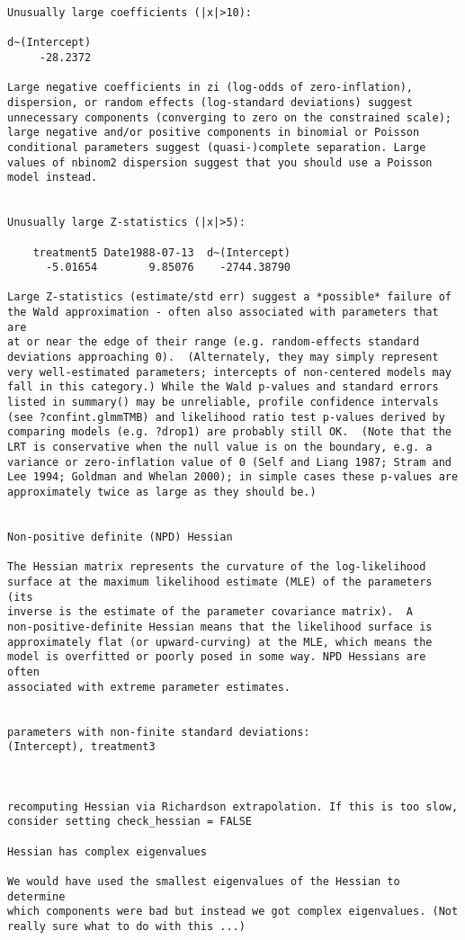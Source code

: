 \documentclass[
  letterpaper,
  DIV=11,
  numbers=noendperiod]{scrreprt}
\begin{document}
\begin{verbatim}
Unusually large coefficients (|x|>10):

d~(Intercept) 
     -28.2372 

Large negative coefficients in zi (log-odds of zero-inflation),
dispersion, or random effects (log-standard deviations) suggest
unnecessary components (converging to zero on the constrained scale);
large negative and/or positive components in binomial or Poisson
conditional parameters suggest (quasi-)complete separation. Large
values of nbinom2 dispersion suggest that you should use a Poisson
model instead.


Unusually large Z-statistics (|x|>5):

    treatment5 Date1988-07-13  d~(Intercept) 
      -5.01654        9.85076    -2744.38790 

Large Z-statistics (estimate/std err) suggest a *possible* failure of
the Wald approximation - often also associated with parameters that are
at or near the edge of their range (e.g. random-effects standard
deviations approaching 0).  (Alternately, they may simply represent
very well-estimated parameters; intercepts of non-centered models may
fall in this category.) While the Wald p-values and standard errors
listed in summary() may be unreliable, profile confidence intervals
(see ?confint.glmmTMB) and likelihood ratio test p-values derived by
comparing models (e.g. ?drop1) are probably still OK.  (Note that the
LRT is conservative when the null value is on the boundary, e.g. a
variance or zero-inflation value of 0 (Self and Liang 1987; Stram and
Lee 1994; Goldman and Whelan 2000); in simple cases these p-values are
approximately twice as large as they should be.)


Non-positive definite (NPD) Hessian

The Hessian matrix represents the curvature of the log-likelihood
surface at the maximum likelihood estimate (MLE) of the parameters (its
inverse is the estimate of the parameter covariance matrix).  A
non-positive-definite Hessian means that the likelihood surface is
approximately flat (or upward-curving) at the MLE, which means the
model is overfitted or poorly posed in some way. NPD Hessians are often
associated with extreme parameter estimates.


parameters with non-finite standard deviations:
(Intercept), treatment3



recomputing Hessian via Richardson extrapolation. If this is too slow, consider setting check_hessian = FALSE 

Hessian has complex eigenvalues

We would have used the smallest eigenvalues of the Hessian to determine
which components were bad but instead we got complex eigenvalues. (Not
really sure what to do with this ...)
\end{verbatim}
\end{document}
